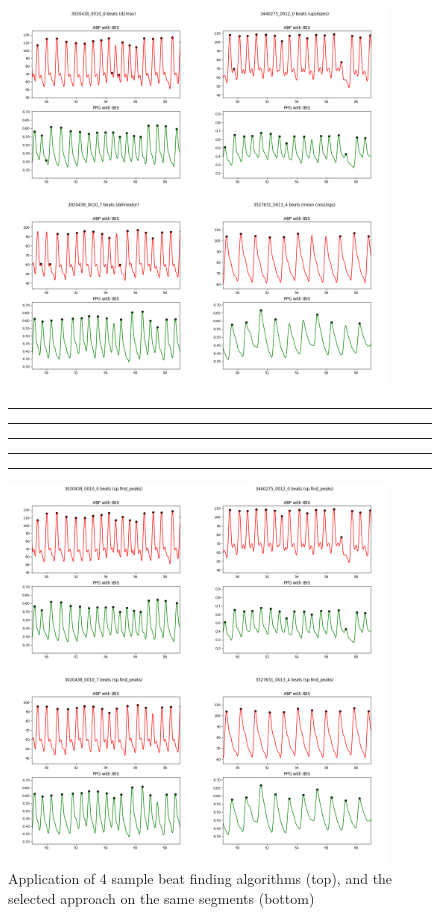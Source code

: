 \begin{figure}[p]
    \centering
    \begin{minipage}{\textwidth}
        \vspace{-2cm}
        \centering
        \includegraphics[width=0.9\textwidth]{images/methods/beat_algos}

        \vspace{-0.8cm}
        \rule{2cm}{0.1mm} \: \rule{2cm}{0.1mm} \: \rule{2cm}{0.1mm} \: \rule{2cm}{0.1mm} \: \rule{2cm}{0.1mm}
        \vspace{0.1cm}

        \includegraphics[width=0.9\textwidth]{images/methods/sp_beats}
        \captionsetup{format=plain, justification=centering, font=small}
        \vspace{-0.5cm}
        \caption{Application of 4 sample beat finding algorithms (top), and the selected approach on the same segments (bottom)}
        \label{fig:sp_beat_algos}
    \end{minipage}
\end{figure}


